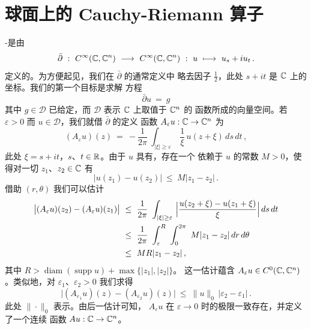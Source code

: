 
\section{球面上的 Cauchy-Riemann 算子}
\label{sec:cr-operator-sphere}

%
%
%

\trCauchy-\trRiemann\trOperator{}是由
\[
\bar{\partial}\ :\ C^{\infty}(\C,\C^{n})\ \longrightarrow\ C^{\infty}(\C,\C^{n})\ :\ u\ \longmapsto\ u_{s}+iu_{t}\,.
\]
定义的\trLinearOperator。为方便起见，我们在 $\bar{\partial}$ 的通常定义中%
略去因子 $\frac{1}{2}$，此处 $s+it$ 是 $\mathbb{C}$ 上的坐标。我们的第一个目标是求解%
方程
\[
\bar{\partial}u\ =\ g
\]
其中 $g\in\mathcal{D}$ 已给定，而 $\mathcal{D}$ 表示 $\mathbb{C}$ 上取值于 $\mathbb{C}^{n}$ 的%
\trCompactSupport{}\trSmooth{}函数所成的向量空间。若 $\varepsilon>0$ 而%
 $u\in\mathcal{D}$，我们就借 $\bar{\partial}$ 的\trGreenFunction{}定义%
函数 $A_{\varepsilon}u:\mathbb{C}\to\mathbb{C}^{n}$ 为
\[
(A_{\varepsilon}u)(z)\ =\ -\frac{1}{2\pi}\ \int_{|\xi|\geq\varepsilon}\ \frac{1}{\xi}\,u(z+\xi)\,ds\,dt\,,
\]
此处 $\xi=s+it$，$s$、$t\in\mathbb{R}$。由于 $u$ 具有\trCompactSupport，存在一个%
依赖于 $u$ 的常数 $M>0$，使得对一切 $z_{1}$、$z_{2}\in\mathbb{C}$ 有
\[
|u(z_{1})-u(z_{2})|\ \leq\ M|z_{1}-z_{2}|\,.
\]
借助\trPolarCoordinates{} $(r,\theta)$ 我们可以估计
\begin{align*}
\bigl|(A_{\varepsilon}u)(z_{2})-(A_{\varepsilon}u)(z_{1})\bigr|\ &\leq\ \frac{1}{2\pi}\ \int_{|\xi|\geq\varepsilon}\ \Bigl|\frac{u(z_{2}+\xi)-u(z_{1}+\xi)}{\xi}\Bigr|\,ds\,dt\\
&\leq\ \frac{1}{2\pi}\ \int_{\varepsilon}^{R}\ \int_{0}^{2\pi}\ M|z_{1}-z_{2}|\,dr\,d\theta\\
&\leq\ MR|z_{1}-z_{2}|\,,
\end{align*}
其中 $R>\operatorname{diam}(\operatorname{supp}u)+\max\bigl\{|z_{1}|,|z_{2}|\bigr\}$。%
这一估计蕴含 $A_{\varepsilon}u\in C^{0}(\mathbb{C},\mathbb{C}^{n})$。类似地，对%
 $\varepsilon_{1}$、$\varepsilon_{2}>0$ 我们求得
\[
\bigl|(A_{\varepsilon_{1}}u)(z)-(A_{\varepsilon_{2}}u)(z)\bigr|\ \leq\ \|u\|_{0}\,|\varepsilon_{2}-\varepsilon_{1}|\,.
\]
此处 $\|\cdot\|_{0}$ 表示\trSupNorm。由后一估计可知，%
$A_{\varepsilon}u$ 在 $\varepsilon\to0$ 时的极限一致存在，并定义了一个连续%
函数 $Au:\mathbb{C}\to\mathbb{C}^{n}$。

